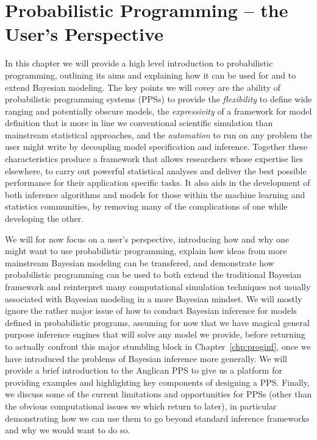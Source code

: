 
\chapter{Probabilistic Programming -- the User's Perspective}
\label{chp:probprog}

In this chapter we will provide a high level introduction to probabilistic programming,
outlining its aims and explaining how it can be used for and to extend Bayesian modeling.  The
key points we will covey are the ability of probabilistic programming systems (PPSs) to provide 
the \emph{flexibility} to define
wide ranging and potentially obscure models, the \emph{expressivity} of a framework for 
model definition that is more in line we conventional scientific simulation than mainstream 
statistical approaches, and the \emph{automation} to  run on any problem the user might write
by decoupling model specification and inference.
Together these characteristics produce a framework that allows researchers whose expertise 
lies elsewhere, to carry out powerful statistical analyses and deliver the best possible 
performance for their application specific tasks.  It also aids in the development of both inference
algorithms and models for those within the machine learning and statistics communities,
by removing many of the complications of one while developing the other.

We will for now focus on a user's perspective, introducing how and why one might want to use
probabilistic programming, explain how ideas from more mainstream Bayesian
modeling can be transfered, and demonstrate how probabilistic programming can be
used to both extend the traditional Bayesian framework and reinterpret many computational simulation
techniques not usually associated with Bayesian modeling in a more Bayesian mindset.
We will mostly ignore the rather major issue of how to conduct Bayesian inference for
models defined in probabilistic programs, assuming for now that we have magical
general purpose inference engines that will solve any model we provide,
before returning to actually confront this major stumbling
block in Chapter~\ref{chp:proginf}, once we have introduced the problems of Bayesian
inference more generally.  We will provide a brief introduction to the Anglican PPS
to give us a platform for providing examples and highlighting
key components of designing a PPS.  Finally, we discuss some of the current limitations
and opportunities for PPSs (other than the obvious computational
issues we which return to later), in particular demonstrating how we can use them to go beyond
standard inference frameworks and why we would want to do so.

